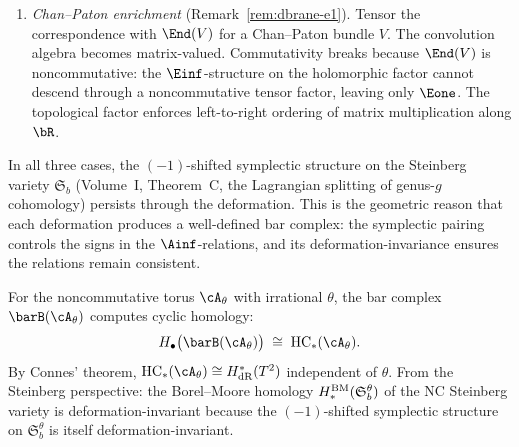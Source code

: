 \begin{remark}
\begin{enumerate}[label=(\Roman*)]
\item \emph{Chan--Paton enrichment} (Remark~\ref{rem:dbrane-e1}).
 Tensor the correspondence with $\End(V)$ for a Chan--Paton bundle $V$.
 The convolution algebra becomes matrix-valued.
 Commutativity breaks because $\End(V)$ is noncommutative: the
 $\Einf$-structure on the holomorphic factor cannot descend through a
 noncommutative tensor factor, leaving only $\Eone$.
 The topological factor enforces left-to-right ordering of matrix
 multiplication along $\bR$.
\end{enumerate}
In all three cases, the $(-1)$-shifted symplectic structure on the
Steinberg variety $\mathfrak{S}_b$ (Volume~I, Theorem~C, the Lagrangian splitting of genus-$g$ cohomology) persists through the
deformation. This is the geometric reason that each deformation produces a
well-defined bar complex: the symplectic pairing controls the signs in the
$\Ainf$-relations, and its deformation-invariance ensures the relations
remain consistent.
\end{remark}

\begin{proposition}
\label{prop:nc-cyclic-steinberg}
For the noncommutative torus $\cA_\theta$ with irrational $\theta$,
the bar complex $\barB(\cA_\theta)$ computes cyclic homology:
\[
 H_\bullet\bigl(\barB(\cA_\theta)\bigr) \;\cong\; \HC_*(\cA_\theta).
\]
By Connes' theorem, $\HC_*(\cA_\theta) \cong H^*_\dR(T^2)$ independent
of $\theta$. From the Steinberg perspective: the Borel--Moore homology
$H_*^{\mathrm{BM}}(\mathfrak{S}_b^\theta)$ of the NC Steinberg variety is
deformation-invariant because the $(-1)$-shifted symplectic structure
on $\mathfrak{S}_b^\theta$ is itself deformation-invariant.
\end{proposition}


